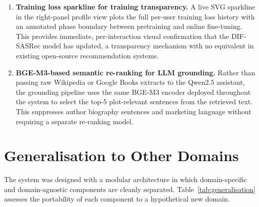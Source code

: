\begin{enumerate}
    \item \textbf{Training loss sparkline for training transparency.}
    A live SVG sparkline in the right-panel profile view plots the full per-user training loss history with an annotated phase boundary between pretraining and online fine-tuning.
    This provides immediate, per-interaction visual confirmation that the DIF-SASRec model has updated, a transparency mechanism with no equivalent in existing open-source recommendation systems.

    \item \textbf{BGE-M3-based semantic re-ranking for LLM grounding.}
    Rather than passing raw Wikipedia or Google Books extracts to the Qwen2.5 assistant, the grounding pipeline uses the same BGE-M3 encoder deployed throughout the system to select the top-5 plot-relevant sentences from the retrieved text.
    This suppresses author biography sentences and marketing language without requiring a separate re-ranking model.
\end{enumerate}


\section{Generalisation to Other Domains}
\label{sec:generalisation}

The system was designed with a modular architecture in which domain-specific and domain-agnostic components are cleanly separated.
Table~\ref{tab:generalisation} assesses the portability of each component to a hypothetical new domain.

